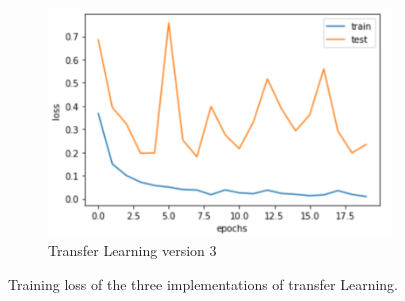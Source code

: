 \begin{figure}[h]
\begin{subfigure}[b]{0.48\linewidth}
   \includegraphics[width=\linewidth]{figs/transfer_loss_3.png}
   \caption{Transfer Learning version 3}
   \label{fig:tri_loss_2}
  \end{subfigure}
  \hfill
    \caption{Training loss of the three implementations of transfer Learning.}
    \label{fig:tertrainloss}
\end{figure}


